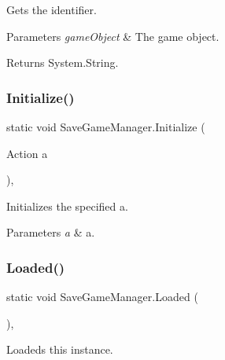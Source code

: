 Gets the identifier. 


\begin{DoxyParams}{Parameters}
{\em game\+Object} & The game object.\\
\hline
\end{DoxyParams}
\begin{DoxyReturn}{Returns}
System.\+String.
\end{DoxyReturn}
\mbox{\label{class_save_game_manager_a235d2f2255aa65272e914ae2adf37e58}} 
\subsubsection{\texorpdfstring{Initialize()}{Initialize()}}
{\footnotesize\ttfamily static void Save\+Game\+Manager.\+Initialize (\begin{DoxyParamCaption}\item[{Action}]{a }\end{DoxyParamCaption})\hspace{0.3cm}{\ttfamily [inline]}, {\ttfamily [static]}}



Initializes the specified a. 


\begin{DoxyParams}{Parameters}
{\em a} & a.\\
\hline
\end{DoxyParams}
\mbox{\label{class_save_game_manager_a9500107785d79ae915b1b05ae2ab0109}} 
\subsubsection{\texorpdfstring{Loaded()}{Loaded()}}
{\footnotesize\ttfamily static void Save\+Game\+Manager.\+Loaded (\begin{DoxyParamCaption}{ }\end{DoxyParamCaption})\hspace{0.3cm}{\ttfamily [inline]}, {\ttfamily [static]}}



Loadeds this instance. 

\mbox{\label{class_save_game_manager_a2aefaa6bf188cc28dcc3abb054190ae7}} 
